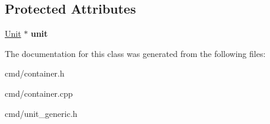 \subsection*{Protected Attributes}
\begin{DoxyCompactItemize}
\item 
\hyperlink{classUnit}{Unit} $\ast$ {\bfseries unit}\hypertarget{classUnitContainer_a52215a2a3ceb2c14c9fe721d606dbddd}{}\label{classUnitContainer_a52215a2a3ceb2c14c9fe721d606dbddd}

\end{DoxyCompactItemize}


The documentation for this class was generated from the following files\+:\begin{DoxyCompactItemize}
\item 
cmd/container.\+h\item 
cmd/container.\+cpp\item 
cmd/unit\+\_\+generic.\+h\end{DoxyCompactItemize}
